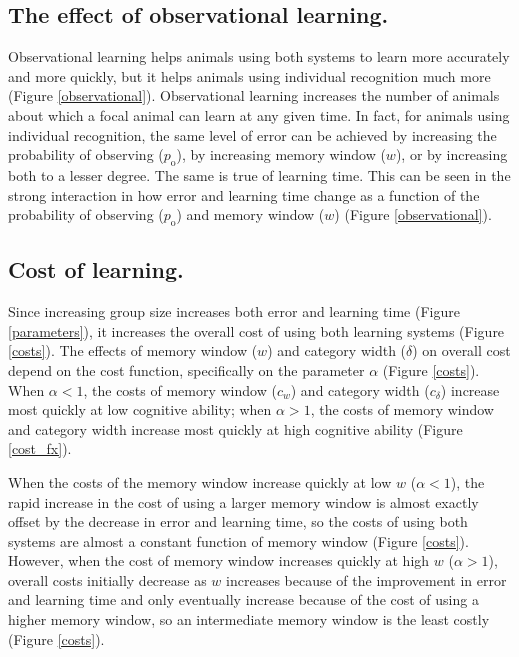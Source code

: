 \subsection*{The effect of observational learning. }
Observational learning helps animals using both systems to learn more accurately and more quickly, but it helps animals using individual recognition much more (Figure \ref{observational}). Observational learning increases the number of animals about which a focal animal can learn at any given time. 
In fact, for animals using individual recognition, the same level of error can be achieved by increasing the probability of observing ($p_\text{o}$), by increasing memory window ($w$), or by increasing both to a lesser degree. The same is true of learning time. This can be seen in the strong interaction in how error and learning time change as a function of the probability of observing ($p_\text{o}$) and memory window ($w$) (Figure \ref{observational}).

%
\subsection*{Cost of learning. }
% 
Since increasing group size increases both error and learning time (Figure \ref{parameters}), it increases the overall cost of using both learning systems (Figure \ref{costs}). The effects of memory window ($w$) and category width ($\delta$) on overall cost depend on the cost function, specifically on the parameter $\alpha$ (Figure \ref{costs}). When $\alpha<1$, the costs of memory window ($c_w$) and category width ($c_\delta$) increase most quickly at low cognitive ability; when $\alpha>1$, the costs of memory window and category width increase most quickly at high cognitive ability (Figure \ref{cost_fx}). 

When the costs of the memory window increase quickly at low $w$ ($\alpha<1$), the rapid increase in the cost of using a larger memory window is almost exactly offset by the decrease in error and learning time, so the costs of using both systems are almost a constant function of memory window (Figure \ref{costs}). However, when the cost of memory window increases quickly at high $w$ ($\alpha>1$), overall costs initially decrease as $w$ increases because of the improvement in error and learning time and only eventually increase because of the cost of using a higher memory window, so an intermediate memory window is the least costly (Figure \ref{costs}).

